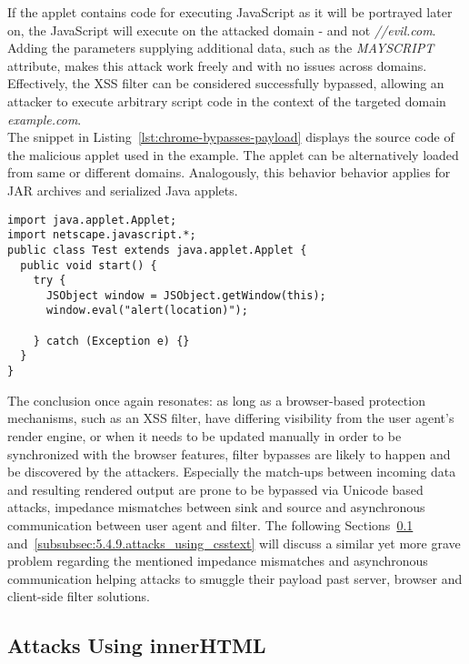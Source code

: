     If the applet contains code for executing JavaScript as it will be portrayed later on, the JavaScript will execute on the attacked domain - and not \textit{//evil.com}. Adding the parameters supplying additional data, such as the \textit{MAYSCRIPT} attribute, makes this attack work freely and with no issues across domains. Effectively, the XSS filter can be considered successfully bypassed, allowing an attacker to execute arbitrary script code in the context of the targeted domain \textit{example.com}. \\

    The snippet in Listing~\ref{lst:chrome-bypasses-payload} displays the source code of the malicious applet used in the example. The applet can be alternatively loaded from same or different domains. Analogously, this behavior behavior applies for JAR archives and serialized Java applets. \\

\begin{lstlisting}[label=lst:chrome-bypasses-payload,caption=Payload for Java-based Chrome XSS filter bypass utilizing DOM access via JSObject,captionpos=b]
import java.applet.Applet; 
import netscape.javascript.*; 
public class Test extends java.applet.Applet { 
  public void start() { 
    try { 
      JSObject window = JSObject.getWindow(this); 
      window.eval("alert(location)"); 

    } catch (Exception e) {} 
  } 
} 
\end{lstlisting} 

    The conclusion once again resonates: as long as a browser-based protection mechanisms, such as an XSS filter, have differing visibility from the user agent's render engine, or when it needs to be updated manually in order to be synchronized with the browser features, filter bypasses are likely to happen and be discovered by the attackers. Especially the match-ups between incoming data and resulting rendered output are prone to be bypassed via Unicode based attacks, impedance mismatches between sink and source and asynchronous communication between user agent and filter. The following Sections~\ref{subsubsec:5.4.8.attacks_using_innerhtml} and~\ref{subsubsec:5.4.9.attacks_using_csstext} will discuss a similar yet more grave problem regarding the mentioned impedance mismatches and asynchronous communication helping attacks to smuggle their payload past server, browser and client-side filter solutions. 
      
    \subsection{Attacks Using innerHTML}
    \label{subsubsec:5.4.8.attacks_using_innerhtml}

